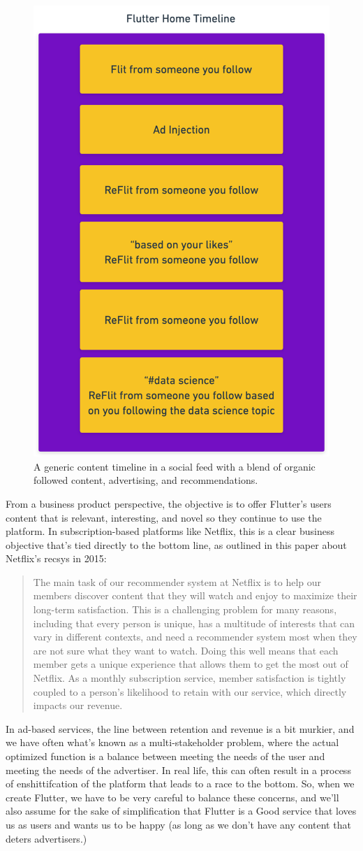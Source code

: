 \documentclass[draft, 11pt]{diazessay} %
\begin{document}
\begin{figure}[!ht]
\centering
\includegraphics[width=.4\textwidth]{figures/timeline.png}
\caption{A generic content timeline in a social feed with a blend of organic followed content, advertising, and recommendations.}
\end{figure}

From a business product perspective, the objective is to offer Flutter’s users content that is relevant, interesting, and novel so they continue to use the platform. In subscription-based platforms like Netflix, this is a clear business objective that's tied directly to the bottom line, as outlined in this paper \citep{steck2021deep}  about Netflix's recsys in 2015: 

\begin{quote}

The main task of our recommender system at Netflix is to help our members discover content that they will watch and enjoy to maximize their long-term satisfaction. This is a challenging problem for many reasons, including that every person is unique, has a multitude of interests that can vary in different contexts, and need a recommender system most when they are not sure what they want to watch. Doing this well means that each member gets a unique experience that allows them to get the most out of Netflix. As a monthly subscription service, member satisfaction is tightly coupled to a person’s likelihood to retain with our service, which directly impacts our revenue.
\end{quote}

In ad-based services, the line between retention and revenue is a bit murkier, and we have often what's known as a multi-stakeholder problem, where the actual optimized function is a balance between meeting the needs of the user and meeting the needs of the advertiser\citep{zheng2017multi}.  In real life, this can often result in a process of enshittifcation\citep{doctorow_2023} of the platform that leads to a race to the bottom. So, when we create Flutter, we have to be very careful to balance these concerns, and we'll also assume for the sake of simplification that Flutter is a Good service that loves us as users and wants us to be happy (as long as we don't have any content that deters advertisers.)
\end{document}
